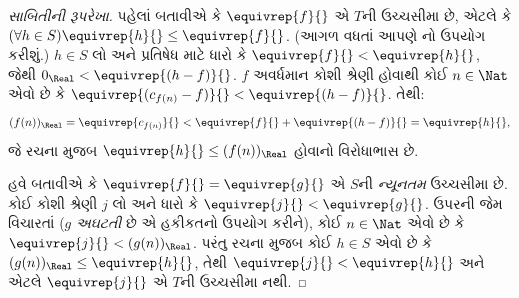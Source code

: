 \documentclass[../../../include/open-logic-section]{subfiles}
\begin{document}
\begin{proof}[સાબિતીની રૂપરેખા]
પહેલાં બતાવીએ કે $\equivrep{f}{}$ એ $T$ની ઉચ્ચસીમા છે, એટલે કે
$(\forall h \in S)\equivrep{h}{} \leq \equivrep{f}{}$.
(આગળ વધતાં આપણે નો ઉપયોગ કરીશું.)
$h \in S$ લો અને પ્રતિષેધ માટે ધારો કે $\equivrep{f}{} <
\equivrep{h}{}$, જેથી $0_\Real < \equivrep{(h-f)}{}$. $f$ અવર્ધમાન
કોશી શ્રેણી હોવાથી કોઈ $n \in \Nat$ એવો છે કે
$\equivrep{(c_{f(n)} - f)}{} < \equivrep{(h-f)}{}$. તેથી:
\[
	(f(n))_\Real = \equivrep{c_{f(n)}}{} < \equivrep{f}{} + \equivrep{(h-f)}{} = \equivrep{h}{},
\]
જે રચના મુજબ $\equivrep{h}{} \leq (f(n))_\Real$ હોવાનો વિરોધાભાસ છે.

હવે બતાવીએ કે $\equivrep{f}{} = \equivrep{g}{}$ એ $S$ની
\emph{ન્યૂનતમ} ઉચ્ચસીમા છે. કોઈ કોશી શ્રેણી $j$ લો અને ધારો કે
$\equivrep{j}{} < \equivrep{g}{}$. ઉપરની જેમ વિચારતાં ($g$
\emph{અઘટતી} છે એ હકીકતનો ઉપયોગ કરીને), કોઈ $n \in \Nat$ એવો છે કે
$\equivrep{j}{} < (g(n))_\Real$. પરંતુ રચના મુજબ કોઈ $h \in S$ એવો
છે કે $(g(n))_\Real \leq \equivrep{h}{}$, તેથી $\equivrep{j}{} <
\equivrep{h}{}$ અને એટલે $\equivrep{j}{}$ એ $T$ની ઉચ્ચસીમા નથી.
\end{proof}
\end{document}
